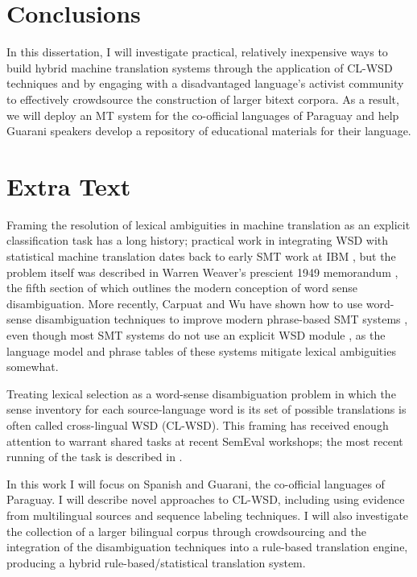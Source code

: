 \documentclass{article}
\begin{document}
\section{Conclusions}
In this dissertation, I will investigate practical, relatively inexpensive ways
to build hybrid machine translation systems through the application of CL-WSD
techniques and by engaging with a disadvantaged language's activist community
to effectively crowdsource the construction of larger bitext corpora. As a
result, we will deploy an MT system for the co-official languages of Paraguay
and help Guarani speakers develop a repository of educational materials for
their language.

\section{Extra Text}
Framing the resolution of lexical ambiguities in machine translation as an
explicit classification task has a long history; practical work in integrating
WSD with statistical machine translation dates back to early SMT work at IBM
\cite{Brown91word-sensedisambiguation}, but the problem itself was described in
Warren Weaver's prescient 1949 memorandum \cite{weavermemo}, the fifth section
of which outlines the modern conception of word sense disambiguation.  More
recently, Carpuat and Wu have shown how to use word-sense disambiguation
techniques to improve modern phrase-based SMT systems \cite{carpuatpsd}, even
though most SMT systems do not use an explicit WSD module \cite{wsdchap3}, as
the language model and phrase tables of these systems mitigate lexical
ambiguities somewhat.

Treating lexical selection as a word-sense disambiguation problem in which the
sense inventory for each source-language word is its set of possible
translations is often called cross-lingual WSD (CL-WSD). This framing has
received enough attention to warrant shared tasks at recent SemEval workshops;
the most recent running of the task is described in \cite{task10}.

In this work I will focus on Spanish and Guarani, the co-official languages of
Paraguay.  I will describe novel approaches to CL-WSD, including using evidence
from multilingual sources and sequence labeling techniques. I will also
investigate the collection of a larger bilingual corpus through crowdsourcing
and the integration of the disambiguation techniques into a rule-based
translation engine, producing a hybrid rule-based/statistical translation
system.

\nocite{*}

{}
\end{document}
